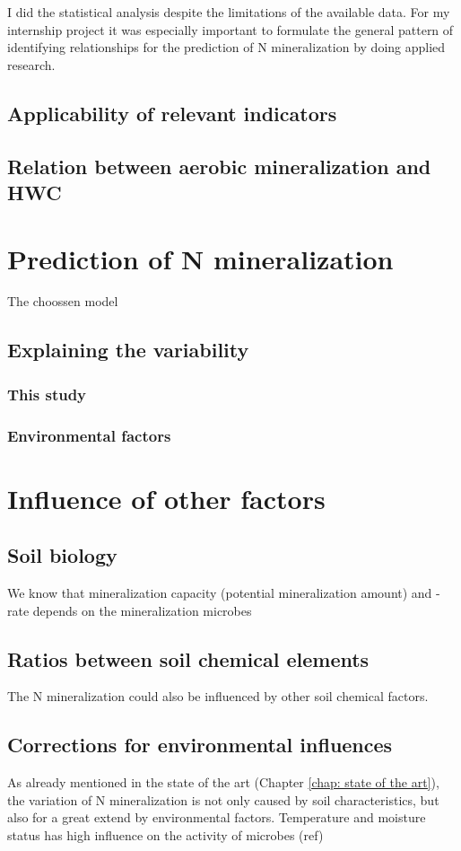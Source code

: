 \documentclass[10pt,twoside,dutch,english]{report}
\begin{document}
   I did the statistical analysis despite the limitations of the available data. For my internship project it was especially important to formulate the general pattern of identifying relationships for the prediction of N mineralization by doing applied research. 
   
	\subsection{Applicability of relevant indicators}
	\subsection{Relation between aerobic mineralization and HWC}

	\section{Prediction of N mineralization}
	The choossen model 

	
	\subsection{Explaining the variability}
	\subsubsection{This study}
	\subsubsection{Environmental factors}
	
	\section{Influence of other factors}
	\subsection{Soil biology}
	We know that mineralization capacity (potential mineralization amount) and -rate depends on the mineralization microbes 
	\subsection{Ratios between soil chemical elements}
	The N mineralization could also be influenced by other soil chemical factors. 
	\subsection{Corrections for environmental influences}
	As already mentioned in the state of the art (Chapter \ref{chap: state of the art}), the variation of N mineralization is not only caused by soil characteristics, but also for a great extend by environmental factors. Temperature and moisture status has high influence on the activity of microbes (ref)
\end{document}
